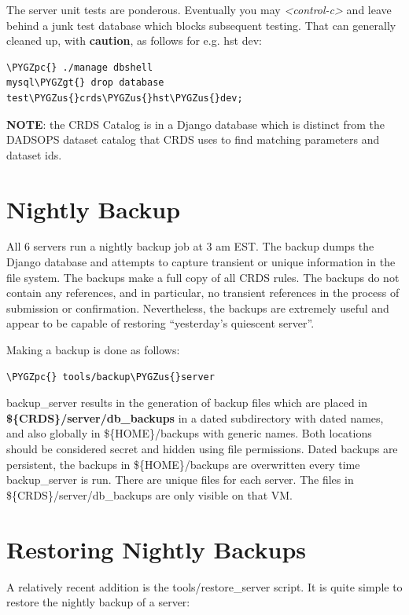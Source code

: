 \documentclass[letterpaper,10pt,english]{sphinxmanual}
\def\PYGZus{\char`\_}
\def\PYGZgt{\char`\>}
\def\PYGZpc{\char`\%}
\begin{document}
The server unit tests are ponderous.  Eventually you may \emph{\textless{}control-c\textgreater{}} and leave behind a junk test
database which blocks subsequent testing.  That can generally cleaned up,  with \textbf{caution},  as follows
for e.g. hst dev:

\begin{Verbatim}[commandchars=\\\{\}]
\PYGZpc{} ./manage dbshell
mysql\PYGZgt{} drop database test\PYGZus{}crds\PYGZus{}hst\PYGZus{}dev;
\end{Verbatim}

\textbf{NOTE}:  the CRDS Catalog is in a Django database which is distinct from the DADSOPS dataset catalog that
CRDS uses to find matching parameters and dataset ids.


\section{Nightly Backup}
\label{server_guide:nightly-backup}
All 6 servers run a nightly backup job at 3 am EST.   The backup dumps the Django database and attempts to capture
transient or unique information in the file system.   The backups make a full copy of all CRDS rules.   The backups
do not contain any references,  and in particular,  no transient references in the process of submission or
confirmation.   Nevertheless,  the backups are extremely useful and appear to be capable of restoring
``yesterday's quiescent server''.

Making a backup is done as follows:

\begin{Verbatim}[commandchars=\\\{\}]
\PYGZpc{} tools/backup\PYGZus{}server
\end{Verbatim}

backup\_server results in the generation of backup files which are placed in \textbf{\$\{CRDS\}/server/db\_backups} in a dated
subdirectory with dated names,  and also globally in \$\{HOME\}/backups with generic names.   Both locations should be
considered secret and hidden using file permissions.   Dated backups are persistent,  the backups in \$\{HOME\}/backups
are overwritten every time backup\_server is run.   There are unique files for each server.   The files in
\$\{CRDS\}/server/db\_backups are only visible on that VM.


\section{Restoring Nightly Backups}
\label{server_guide:restoring-nightly-backups}
A relatively recent addition is the tools/restore\_server script.   It is quite simple to restore the nightly backup
of a server:
\end{document}
